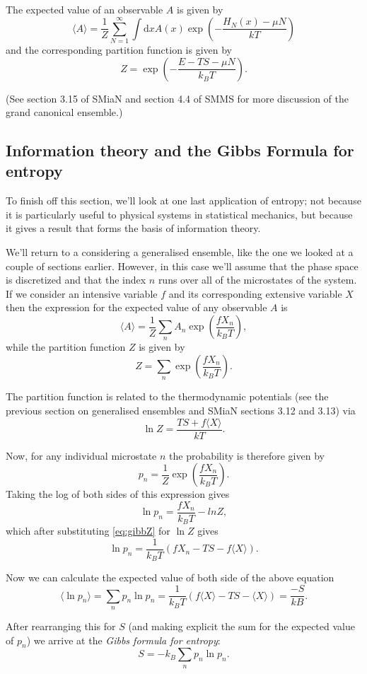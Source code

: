 The expected value of an observable $A$ is given by
$$
	\langle A\rangle = \frac{1}{Z}\sum_{N=1}^{\infty}\int\mathrm{d}xA(x)\exp\left(-\frac{H_N(x)-\mu N}{k T}\right)
$$
and the corresponding partition function is given by
$$
	Z=\exp\left(-\frac{E-TS-\mu N}{k_B T}\right).
$$

(See section 3.15 of SMiaN and section 4.4 of SMMS for more discussion of the grand canonical ensemble.)

\subsection{Information theory and the Gibbs Formula for entropy}
To finish off this section, we'll look at one last application of entropy; not because it is particularly useful to physical systems in statistical mechanics, but because it gives a result that forms the basis of information theory.

We'll return to a considering a generalised ensemble, like the one we looked at a couple of sections earlier. However, in this case we'll assume that the phase space is discretized and that the index $n$ runs over all of the microstates of the system. If we consider an intensive variable $f$ and its corresponding extensive variable $X$ then the expression for the expected value of any observable $A$ is
$$
	\langle A \rangle = \frac{1}{Z}\sum_n A_n\exp\left(\frac{fX_n}{k_BT}\right),
$$
while the partition function $Z$ is given by
$$
	Z =\sum_n\exp\left(\frac{fX_n}{k_BT}\right).
$$

The partition function is related to the thermodynamic potentials (see the previous section on generalised ensembles and SMiaN sections 3.12 and 3.13) via
\begin{equation}
	\ln Z = \frac{TS+f\langle X\rangle}{kT}.
	\label{eq:gibbZ}
\end{equation}

Now, for any individual microstate $n$ the probability is therefore given by
$$
	p_n = \frac{1}{Z}\exp\left(\frac{fX_n}{k_BT}\right).
$$
Taking the log of both sides of this expression gives
$$
	\ln p_n = \frac{fX_n}{k_BT} - ln Z,
$$
which after substituting \ref{eq:gibbZ} for $\ln Z$ gives
$$
	\ln p_n = \frac{1}{k_BT}(fX_n -TS -f\langle X\rangle).
$$

Now we can calculate the expected value of both side of the above equation
$$
	\langle \ln p_n \rangle = \sum_n p_n\ln p_n = \frac{1}{k_BT}(f\langle X\rangle -TS -\langle X \rangle) = \frac{-S}{kB}.
$$

After rearranging this for $S$ (and making explicit the sum for the expected value of $p_n$) we arrive at the \emph{Gibbs formula for entropy}:
$$
	S = -k_B\sum_np_n\ln p_n.
$$

